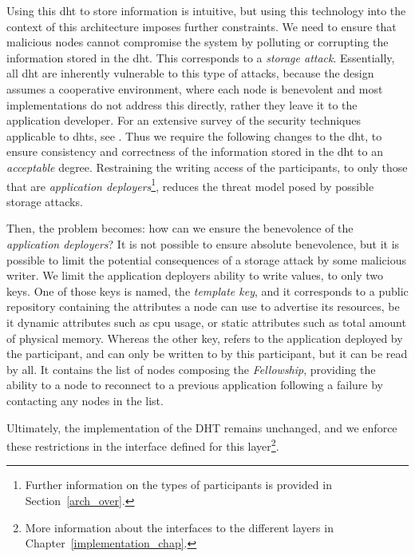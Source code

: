 \documentclass[12pt, titlepage]{uo_temp}
\begin{document}
     Using this \gls{dht} to store information is intuitive, but using this technology
     into the context of this architecture imposes further constraints. We need to ensure
     that malicious nodes cannot compromise the system by polluting or corrupting the
     information stored in the \gls{dht}. This corresponds to a \emph{storage attack}.
     Essentially, all \gls{dht} are inherently vulnerable to this type of attacks, because
     the design assumes a cooperative environment, where each node is benevolent and most
     implementations do not address this directly, rather they leave it to the application
     developer. For an extensive survey of the security techniques applicable to
     \gls{dht}s, see \cite{urdaneta2011survey}. Thus we require the following changes to
     the \gls{dht}, to ensure consistency and correctness of the information stored in the
     \gls{dht} to an \emph{acceptable} degree. Restraining the writing access of the
     participants, to only those that are \emph{application deployers}\footnote{Further
       information on the types of participants is provided in Section~\ref{arch_over}.},
     reduces the threat model posed by possible storage attacks.

     Then, the problem becomes: how can we ensure the benevolence of the \emph{application
       deployers}? It is not possible to ensure absolute benevolence, but it is possible
     to limit the potential consequences of a storage attack by some malicious writer. We
     limit the application deployers ability to write values, to only two keys. One of
     those keys is named, the \emph{template key}, and it corresponds to a public
     repository containing the attributes a node can use to advertise its resources, be it
     dynamic attributes such as \gls{cpu} usage, or static attributes such as total amount
     of physical memory. Whereas the other key, refers to the application deployed by the
     participant, and can only be written to by this participant, but it can be read by
     all. It contains the list of nodes composing the \emph{Fellowship}, providing the
     ability to a node to reconnect to a previous application following a failure by
     contacting any nodes in the list.

     Ultimately, the implementation of the DHT remains unchanged, and we enforce these
     restrictions in the interface defined for this layer\footnote{More information
       about the interfaces to the different layers in Chapter~\ref{implementation_chap}.}.
\end{document}
